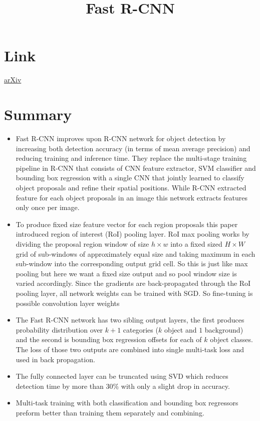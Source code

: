 \documentclass{article}
\title{Fast R-CNN}
\author{}
\date{}
\begin{document}
\maketitle

\section*{Link}
\href{https://arxiv.org/abs/1504.08083}{arXiv} 

\section*{Summary}
\begin{itemize}
    \item Fast R-CNN improves upon R-CNN network for object detection by increasing both detection accuracy (in terms of mean average precision) and reducing training and inference time. They replace the multi-stage training pipeline in R-CNN that consists of CNN feature extractor, SVM classifier and bounding box regression with a single CNN that jointly learned to classify object proposals and refine their spatial positions. While R-CNN extracted feature for each object proposals in an image this network extracts features only once per image.
    \item To produce fixed size feature vector for each region proposals this paper introduced region of interest (RoI) pooling layer. RoI max pooling works by dividing the proposal region window of size $h\times w$ into a fixed sized $H\times W$ grid of sub-windows of approximately equal size and taking maximum in each sub-window into the corresponding output grid cell. So this is just like max pooling but here we want a fixed size output and so pool window size is varied accordingly. Since the gradients are back-propagated through the RoI pooling layer,  all network weights can be trained with SGD. So fine-tuning is possible convolution layer weights 
    \item The Fast R-CNN network has two sibling output layers, the first produces probability distribution over $k+1$ categories ($k$ object and $1$ background) and the second is bounding box regression offsets for each of $k$ object classes. The loss of those two outputs are combined into single multi-task loss and used in back propagation.
    \item The fully connected layer can be truncated using SVD which reduces detection time by more than 30\% with only a slight drop in accuracy.
    \item Multi-task training with both classification and bounding box regressors preform better than training them separately and combining.

\end{itemize}
\end{document}
